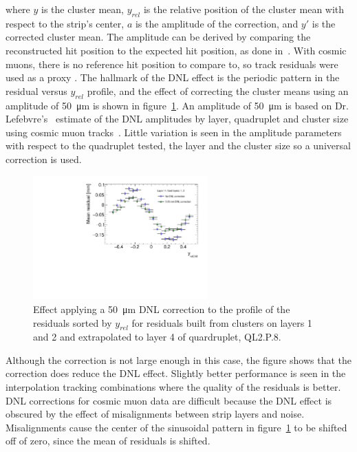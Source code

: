 where $y$ is the cluster mean, $y_{rel}$ is the relative position of the cluster mean with respect to the strip's center, $a$ is the amplitude of the correction, and $y'$ is the corrected cluster mean. The amplitude can be derived by comparing the reconstructed hit position to the expected hit position, as done in~\cite{abusleme_performance_2016}. With cosmic muons, there is no reference hit position to compare to, so track residuals were used as a proxy \cite{lefebvre_thesis}. The hallmark of the DNL effect is the periodic pattern in the residual versus $y_{rel}$ profile, and the effect of correcting the cluster means using an amplitude of \SI{50}{\micro\meter} is shown in figure~\ref{fig:dnl_corr_effect}. An amplitude of \SI{50}{\micro\meter} is based on Dr. Lefebvre's~\cite{lefebvre_thesis} estimate of the DNL amplitudes by layer, quadruplet and cluster size using cosmic muon tracks~\cite{lefebvre_thesis}. Little variation is seen in the amplitude parameters with respect to the quadruplet tested, the layer and the cluster size so a universal correction is used.

\begin{figure}
    \centering
    \includegraphics[width = 0.6\textwidth]{figures/figure_dnl_profiles_blue_QL2P08_3100V_2021-06-18_no_dnl_green_QL2P08_3100V_2021-06-18_2_50um_universal_DNL_layer4_fixed12.pdf}
    \caption{Effect applying a \SI{50}{\micro\meter} DNL correction to the profile of the residuals sorted by $y_{rel}$ for residuals built from clusters on layers 1 and 2 and extrapolated to layer 4 of quardruplet, QL2.P.8.}
    \label{fig:dnl_corr_effect}
\end{figure} 

Although the correction is not large enough in this case, the figure shows that the correction does reduce the DNL effect. Slightly better performance is seen in the interpolation tracking combinations where the quality of the residuals is better. DNL corrections for cosmic muon data are difficult because the DNL effect is obscured by the effect of misalignments between strip layers and noise. Misalignments cause the center of the sinusoidal pattern in figure~\ref{fig:dnl_corr_effect} to be shifted off of zero, since the mean of residuals is shifted.

